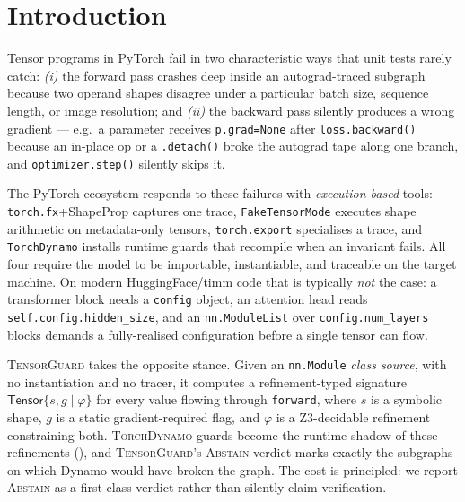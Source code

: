 \section{Introduction}\label{sec:intro}

Tensor programs in PyTorch fail in two characteristic ways that
unit tests rarely catch: \emph{(i)} the forward pass crashes deep
inside an autograd-traced subgraph because two operand shapes
disagree under a particular batch size, sequence length, or
image resolution; and \emph{(ii)} the backward pass silently
produces a wrong gradient --- e.g.\ a parameter receives
\texttt{p.grad=None} after \texttt{loss.backward()} because an
in-place op or a \verb|.detach()| broke the autograd tape along
one branch, and \texttt{optimizer.step()} silently skips it.

The PyTorch ecosystem responds to these failures with
\emph{execution-based} tools: \texttt{torch.fx}+ShapeProp
captures one trace, \texttt{FakeTensorMode} executes shape
arithmetic on metadata-only tensors, \texttt{torch.export}
specialises a trace, and \texttt{TorchDynamo} installs runtime
guards that recompile when an invariant fails. All four require
the model to be importable, instantiable, and traceable on the
target machine. On modern HuggingFace/timm code that is
typically \emph{not} the case: a transformer block needs a
\texttt{config} object, an attention head reads
\texttt{self.config.hidden\_size}, and an
\texttt{nn.ModuleList} over \texttt{config.num\_layers} blocks
demands a fully-realised configuration before a single tensor
can flow.

\textsc{TensorGuard} takes the opposite stance. Given an
\texttt{nn.Module} \emph{class source}, with no instantiation
and no tracer, it computes a refinement-typed signature
$\mathsf{Tensor}\{s,g\mid\varphi\}$ for every value flowing
through \texttt{forward}, where $s$ is a symbolic shape, $g$ is
a static gradient-required flag, and $\varphi$ is a
Z3-decidable refinement constraining both. \textsc{TorchDynamo}
guards become the runtime shadow of these refinements
(), and \textsc{TensorGuard}'s
\textsc{Abstain} verdict marks exactly the subgraphs on which
Dynamo would have broken the graph. The cost is principled:
we report \textsc{Abstain} as a first-class verdict rather than
silently claim verification.

